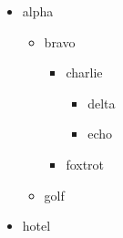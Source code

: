 \begin{itemize}
   \item alpha
      \begin{itemize}
         \item bravo
            \begin{itemize}
               \item charlie
                  \begin{itemize}
                     \item delta
                     \item echo
                  \end{itemize}
               \item foxtrot
            \end{itemize}
         \item golf
      \end{itemize}
   \item hotel
\end{itemize}